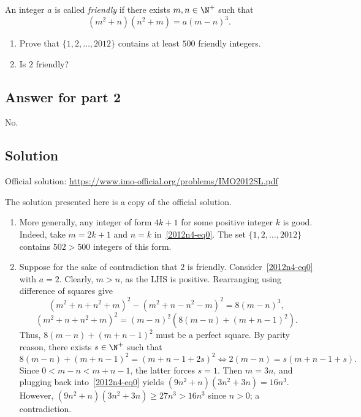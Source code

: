 An integer $a$ is called \emph{friendly} if there exists $m, n \in \N^+$ such that
\[ (m^2 + n)(n^2 + m) = a(m - n)^3. \tag{*}\label{2012n4-eq0} \]

\begin{enumerate}
    \item   Prove that $\{1, 2, …, 2012\}$ contains at least $500$ friendly integers.
    \item   Is $2$ friendly?
\end{enumerate}



\subsection*{Answer for part 2}

No.



\subsection*{Solution}

Official solution: \url{https://www.imo-official.org/problems/IMO2012SL.pdf}

The solution presented here is a copy of the official solution.

\begin{enumerate}

    \item 
    More generally, any integer of form $4k + 1$ for some positive integer $k$ is good.
    Indeed, take $m = 2k + 1$ and $n = k$ in~\eqref{2012n4-eq0}.
    The set $\{1, 2, \ldots, 2012\}$ contains $502 > 500$ integers of this form.

    \item
    Suppose for the sake of contradiction that $2$ is friendly.
    Consider~\eqref{2012n4-eq0} with $a = 2$.
    Clearly, $m > n$, as the LHS is positive.
    Rearranging using difference of squares give
    \[ (m^2 + n + n^2 + m)^2 - (m^2 + n - n^2 - m)^2 = 8(m - n)^3, \]
    \[ (m^2 + n + n^2 + m)^2 = (m - n)^2 (8(m - n) + (m + n - 1)^2). \]
    Thus, $8(m - n) + (m + n - 1)^2$ must be a perfect square.
    By parity reason, there exists $s \in \N^+$ such that
    \[ 8(m - n) + (m + n - 1)^2 = (m + n - 1 + 2s)^2 \iff 2(m - n) = s(m + n - 1 + s). \]
    Since $0 < m - n < m + n - 1$, the latter forces $s = 1$.
    Then $m = 3n$, and plugging back into~\eqref{2012n4-eq0} yields $(9n^2 + n)(3n^2 + 3n) = 16n^3$.
    However, $(9n^2 + n)(3n^2 + 3n) \geq 27n^3 > 16n^3$ since $n > 0$; a contradiction.

\end{enumerate}

